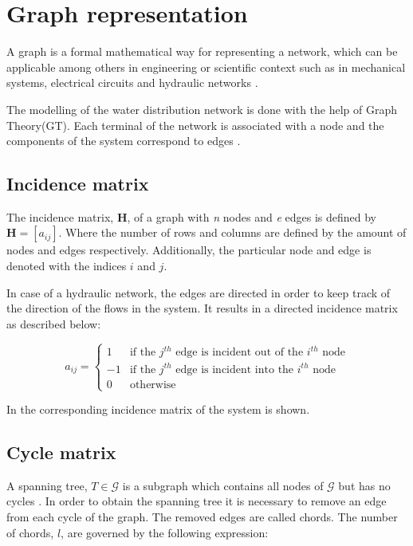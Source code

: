 \section{Graph representation}  
\label{GraphTheory}

A graph is a formal mathematical way for representing a network, which can be applicable among others in engineering or scientific context such as in mechanical systems, electrical circuits and hydraulic networks \cite{graph_intro}. 

The modelling of the water distribution network is done with the help of Graph Theory(GT). Each terminal of the network is associated with a node and the components of the system correspond to edges \cite{GraphTheoryCarsten}. 
\subsection*{Incidence matrix} 
\label{IncidenceSection}
The incidence matrix, $\bm{H}$, of a graph with \textit{n} nodes and \textit{e} edges is 
defined by $\bm{H} = [a_{ij}]$. Where the number of rows and columns are defined by the amount of nodes and edges respectively. 
Additionally, the particular node and edge is denoted with the indices $i$ and 
$j$.

In case of a hydraulic network, the edges are directed in order to keep track of the direction of the flows in the system. It results in a directed incidence matrix as described below:

\begin{equation}
\label{DiGraph}
 a_{ij} =
		\left\{
		\begin{array}{ll}
		
		1 			&      \text{if the $j^{th}$ edge is incident out of the $i^{th}$ node}	
\\
		-1                       &     \text{if the $j^{th}$ edge is incident into the $i^{th}$ node}
\\


                0                       &      \text{otherwise}

		\end{array}
		\right.
\end{equation}	

In  the corresponding incidence matrix of the system is 
shown. 

\subsection*{Cycle matrix}
\label{CycleSection}
A spanning tree, $T \in \mathcal{G}$ is a subgraph which contains all nodes of $\mathcal{G}$ but has no cycles \cite{GraphModel}. 
In order to obtain the spanning tree it is necessary to remove an edge from each cycle of the graph. The removed edges are called chords. The number of chords, $l$, are governed by the following expression:

